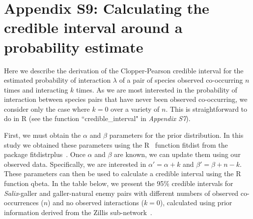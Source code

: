 \documentclass[12pt]{article}
\begin{document}
\clearpage

\section*{Appendix S9: Calculating the credible interval around a probability estimate}

  Here we describe the derivation of the Clopper-Pearson credible interval for the estimated probability of interaction $\lambda$ of a pair of species observed co-occurring $n$ times and interacting $k$ times. As we are most interested in the probability of interaction between species pairs that have never been observed co-occurring, we consider only the case where $k=0$ over a variety of $n$. This is straightforward to do in R (see the function ``credible\_interval" in \emph{Appendix S7}). 


  First, we must obtain the $\alpha$ and $\beta$ parameters for the prior distribution. In this study we obtained these parameters using the R~\citep{R} function fitdist from the package fitdistrplus~\citep{fitdistrplus}. Once $\alpha$ and $\beta$ are known, we can update them using our observed data. Specifically, we are interested in $\alpha'=\alpha+k$ and $\beta'=\beta+n-k$. These parameters can then be used to calculate a credible interval using the R~\citep{R} function qbeta. In the table below, we present the 95\% credible intervals for \emph{Salix}-galler and galler-natural enemy pairs with different numbers of observed co-occurrences ($n$) and no observed interactions ($k=0$), calculated using prior information derived from the Zillis sub-network~\citep{Kopelke2017}.
\end{document}
